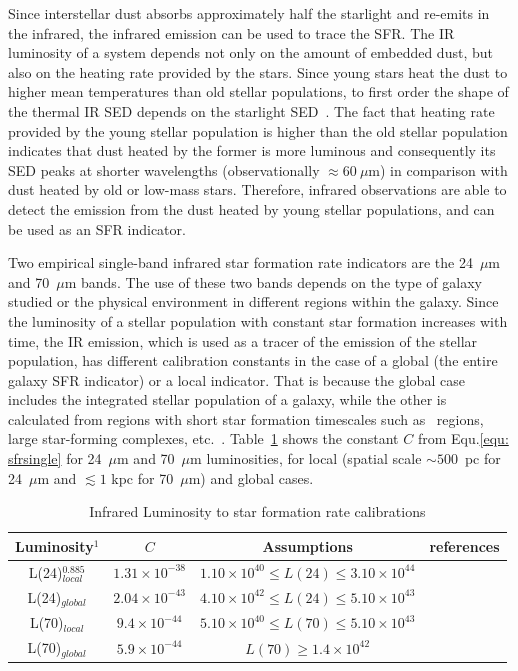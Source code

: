 Since interstellar dust absorbs approximately half the starlight and re-emits in the infrared, the infrared emission can be used to trace the SFR.
The IR luminosity of a system depends not only on the amount of embedded dust, but also on the heating rate provided by the stars. 
Since young stars heat the dust to higher mean temperatures than old stellar populations, to first order the shape of the thermal IR SED depends on the starlight SED~\citep{Helou86}.
The fact that heating rate provided by the young stellar population is higher than the old stellar population indicates that dust heated by the former is more luminous and consequently its SED peaks at shorter wavelengths (observationally $\approx 60~\mu$m) in comparison with dust heated by old or low-mass stars.
Therefore, infrared observations are able to detect the emission from the dust heated by young stellar populations, and can be used as an SFR indicator.  

Two empirical single-band infrared star formation rate indicators are the 24~$\mu$m and 70~$\mu$m bands.  
The use of these two bands depends on the type of galaxy studied or the physical environment in different regions within the galaxy. 
Since the luminosity of a stellar population with constant star formation increases with time, the IR emission, which is used as a tracer of the emission of the stellar population, has different calibration constants in the case of a global (the entire galaxy SFR indicator) or a local indicator.
That is because the global case includes the integrated stellar population of a galaxy, while the other is calculated from regions with short star formation timescales such as \hii~regions, large star-forming complexes, etc.~\cite{Calzetti13}.
Table~\ref{table2} shows the constant $C$ from Equ.\ref{equ: sfrsingle} for 24~$\mu$m and 70~$\mu$m luminosities, for local (spatial scale $\sim500$~pc for 24~$\mu$m and $\lesssim 1$ kpc for 70~$\mu$m) and global cases. 

\begin{table}
\centering
\caption{Infrared Luminosity to star formation rate calibrations}
\label{table2}
\begin{tabular}{ c c c c }
\hline\hline
Luminosity$^1$ & $C$ & Assumptions & references\\ 
\hline
L(24)$^{0.885}_{local}$ & $1.31 \times 10^{-38}$ &$1.10\times 10^{40} \le L(24) \le 3.10\times 10^{44}$&  \cite{Calzetti07}   \\ 
L(24)$_{global}$ & $2.04 \times 10^{-43}$ &$ 4.10\times 10^{42} \le L(24)  \le 5.10\times 10^{43}$& \cite{Calzetti07} \\
L(70)$_{local}$ & $9.4 \times 10^{-44} $ &$5.10\times 10^{40} \le  L(70) \le 5.10\times 10^{43}$& \cite{Li12} \\
L(70)$_{global}$& $5.9 \times 10^{-44}$ &$L(70) \ge 1.4 \times 10^{42} $& \cite{Li10}\\
\hline
\end{tabular}
\end{table}  

